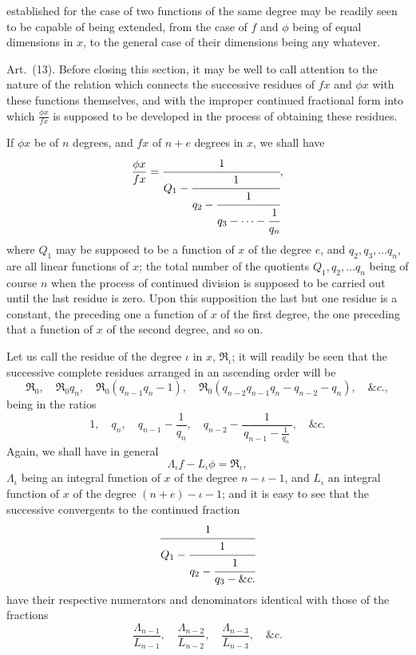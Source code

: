 \documentclass[11pt]{article}
\newcommand{\sourcepage}[1]{\marginpar{\scriptsize p.~#1}}
\newcommand{\art}[1]{\par\smallskip\noindent Art.~(#1).\quad}
\begin{document}
\sourcepage{457}
established for the case of two functions of the same degree may be readily seen to be capable of being extended, from the case of $f$ and $\phi$ being of equal dimensions in $x$, to the general case of their dimensions being any whatever.

\art{13} Before closing this section, it may be well to call attention to the nature of the relation which connects the successive residues of $fx$ and $\phi x$ with these functions themselves, and with the improper continued fractional form into which $\frac{\phi x}{fx}$ is supposed to be developed in the process of obtaining these residues.

If $\phi x$ be of $n$ degrees, and $fx$ of $n+e$ degrees in $x$, we shall have
\[
\frac{\phi x}{fx}
=
\cfrac{1}{Q_1-\cfrac{1}{q_2-\cfrac{1}{q_3-\cdots-\cfrac{1}{q_n}}}},
\]
where $Q_1$ may be supposed to be a function of $x$ of the degree $e$, and $q_2,q_3,\ldots q_n$, are all linear functions of $x$; the total number of the quotients $Q_1,q_2,\ldots q_n$ being of course $n$ when the process of continued division is supposed to be carried out until the last residue is zero. Upon this supposition the last but one residue is a constant, the preceding one a function of $x$ of the first degree, the one preceding that a function of $x$ of the second degree, and so on.

Let us call the residue of the degree $\iota$ in $x$, $\mathfrak{R}_\iota$; it will readily be seen that the successive complete residues arranged in an ascending order will be
\[
\mathfrak{R}_0,\quad
\mathfrak{R}_0q_n,\quad
\mathfrak{R}_0(q_{n-1}q_n-1),\quad
\mathfrak{R}_0(q_{n-2}q_{n-1}q_n-q_{n-2}-q_n),\quad\&c.,
\]
being in the ratios
\[
1,\quad q_n,\quad q_{n-1}-\frac1{q_n},\quad
q_{n-2}-\frac1{\,q_{n-1}-\frac1{q_n}\,},\quad\&c.
\]
Again, we shall have in general
\[
\Lambda_\iota f-L_\iota\phi=\mathfrak{R}_\iota,
\tag{15}
\]
$\Lambda_\iota$ being an integral function of $x$ of the degree $n-\iota-1$, and $L_\iota$ an integral function of $x$ of the degree $(n+e)-\iota-1$; and it is easy to see that the successive convergents to the continued fraction
\[
\cfrac{1}{Q_1-\cfrac{1}{q_2-\cfrac{1}{q_3-\&c.}}}
\]
have their respective numerators and denominators identical with those of the fractions
\[
\frac{\Lambda_{n-1}}{L_{n-1}},\quad
\frac{\Lambda_{n-2}}{L_{n-2}},\quad
\frac{\Lambda_{n-3}}{L_{n-3}},\quad\&c.
\]
\end{document}

